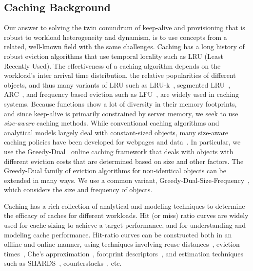 \subsection{Caching Background}
\label{sec:faascache:bg}

Our answer to solving the twin conundrum of keep-alive and provisioning that is robust to workload heterogeneity and dynamism, is to use concepts from a related, well-known field with the same challenges. 
%
Caching has a long history of robust eviction algorithms that use temporal locality such as  LRU (Least Recently Used). 
The effectiveness of a caching algorithm depends on the workload's inter arrival time distribution, the relative popularities of different objects, and thus many variants of LRU such as LRU-k~\cite{o1993lru}, segmented LRU~\cite{cheng2000lru}, ARC~\cite{megiddo2003arc}, and frequency based eviction such as LFU~\cite{einziger2017tinylfu}, are widely used in caching systems. 
Because functions show a lot of diversity in their memory footprints, and since keep-alive is primarily constrained by server memory, we seek to use \emph{size-aware} caching methods. 
While conventional caching algorithms and analytical models largely deal with constant-sized objects, many size-aware caching policies have been developed for webpages and data~\cite{cao_irani_1997}. 
In particular, we use the Greedy-Dual~\cite{young_gd_orig_94} online caching framework that deals with objects with different eviction costs that are determined based on size and other factors.
The Greedy-Dual family of eviction algorithms for non-identical objects can be extended in many ways.
We use a common variant, Greedy-Dual-Size-Frequency~\cite{gdsf, gdfs_2001,cherkasova2001role}, which considers the size and frequency of objects. 


Caching has a rich collection of analytical and modeling techniques to determine the efficacy of caches for different workloads.
Hit (or miss) ratio curves are widely used for cache sizing to achieve a target performance, and for understanding and modeling cache performance. 
Hit-ratio curves can be constructed both in an offline and online manner, using techniques involving reuse distances~\cite{osca_atc20}, eviction times~\cite{hu2016kinetic}, Che's approximation~\cite{che2002hierarchical}, footprint descriptors~\cite{sundarrajan2017footprint}, and estimation techniques such as SHARDS~\cite{shards}, counterstacks~\cite{counterstacks}, etc. 

